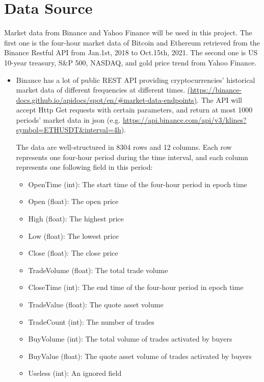 \documentclass[a4paper]{article}
\begin{document}
\section{Data Source}
Market data from Binance and Yahoo Finance will be used in this project. The first one is the four-hour market data of Bitcoin and Ethereum retrieved from the Binance Restful API from Jan.1st, 2018 to Oct.15th, 2021. The second one is US 10-year treasury, S\&P 500, NASDAQ, and gold price trend from Yahoo Finance.
\begin{itemize}
    \item Binance has a lot of public REST API providing cryptocurrencies’ historical market data of different frequencies at different times. \href{https://binance-docs.github.io/apidocs/spot/en/#market-data-endpoints}{(https://binance-docs.github.io/apidocs/spot/en/\#market-data-endpoints)}. The API will accept Http Get requests with certain parameters, and return at most 1000 periods' market data in json (e.g. \href{https://api.binance.com/api/v3/klines?symbol=ETHUSDT\&interval=4h}{https://api.binance.com/api/v3/klines?symbol=ETHUSDT\&interval=4h}).
    \par The data are well-structured in 8304 rows and 12 columns. Each row represents one four-hour period during the time interval, and each column represents one following field in this period:
    \begin{itemize}
        \item OpenTime (int): The start time of the four-hour period in epoch time
        \item Open (float): The open price
        \item High (float): The highest price
        \item Low (float): The lowest price
        \item Close (float): The close price
        \item TradeVolume (float): The total trade volume
        \item CloseTime (int): The end time of the four-hour period in epoch time
        \item TradeValue (float): The quote asset volume
        \item TradeCount (int): The number of trades
        \item BuyVolume (int): The total volume of trades activated by buyers
        \item BuyValue (float): The quote asset volume of trades activated by buyers
        \item Useless (int): An ignored field

\end{itemize}
\end{itemize}
\end{document}
